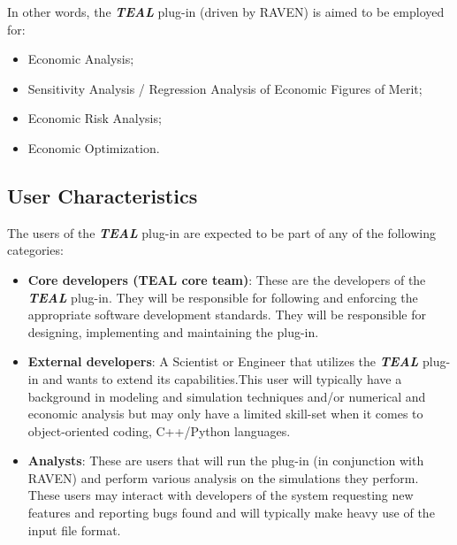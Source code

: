 In other words, the  \textbf{\textit{TEAL}} plug-in (driven by RAVEN) is aimed to be employed for:
\begin{itemize}
  \item Economic Analysis;
  \item Sensitivity Analysis / Regression Analysis of Economic Figures of Merit;
  \item Economic Risk Analysis;
  \item Economic Optimization.
\end{itemize}


\subsection{User Characteristics}

The users of the \textbf{\textit{TEAL}} plug-in are expected to be part of any of the
following categories:
\begin{itemize}
  \item \textbf{Core developers (TEAL core team)}: These are the developers of the \textbf{\textit{TEAL}}  plug-in. They will be responsible for following
    and enforcing the appropriate software development standards. They will be responsible for designing, implementing and 
    maintaining the plug-in.
  \item \textbf{External developers}: A Scientist or Engineer that utilizes the \textbf{\textit{TEAL}}  plug-in and wants to extend its
  capabilities.This user will typically have a background in modeling and 
simulation techniques and/or numerical and economic analysis but may only have a limited skill-set when it comes to object-oriented 
coding, C++/Python languages.
  \item \textbf{Analysts}:  These are users that will run the plug-in (in conjunction with RAVEN) and perform various analysis on the 
  simulations they perform. These users may interact with developers of the system requesting new features and reporting bugs found 
  and will typically make heavy use of the input file format.
\end{itemize}
